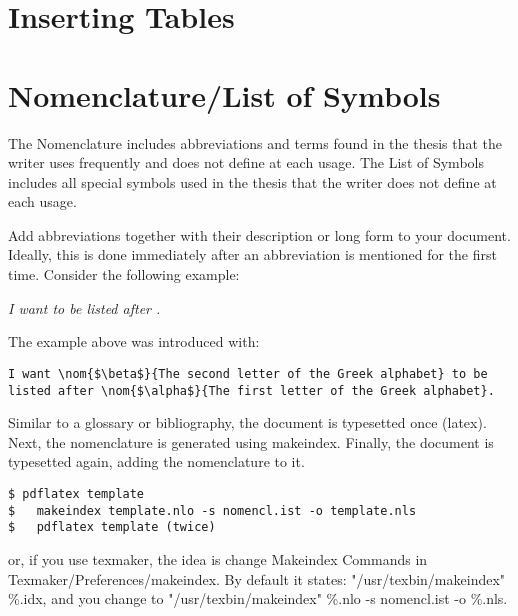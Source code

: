 

\section{Inserting Tables} %
\label{sec:inserting_tables}


\section{Nomenclature/List of Symbols} %
\label{sec:nomenclature}

The Nomenclature includes abbreviations and terms found in the thesis that the writer uses frequently and does not define at each usage. The List of Symbols includes all special symbols used in the thesis that the writer does not define at each usage.

Add abbreviations together with their description or long form to your document. Ideally, this is done immediately after an abbreviation is mentioned for the first time. Consider the following example:

\textit{I want  to be listed after .}

The example above was introduced with:

 \begin{lstlisting}
I want \nom{$\beta$}{The second letter of the Greek alphabet} to be listed after \nom{$\alpha$}{The first letter of the Greek alphabet}.
 \end{lstlisting}
 
Similar to a glossary or bibliography, the document is typesetted once (latex). Next, the nomenclature is generated using makeindex. Finally, the document is typesetted again, adding the nomenclature to it.

\begin{verbatim}
$ pdflatex template
$	makeindex template.nlo -s nomencl.ist -o template.nls
$	pdflatex template (twice)
\end{verbatim}

or, if you use texmaker, the idea is change  Makeindex Commands in  Texmaker/Preferences/makeindex. By default it states:  "/usr/texbin/makeindex" \%.idx,  and you change to "/usr/texbin/makeindex" \%.nlo -s nomencl.ist -o \%.nls. 

